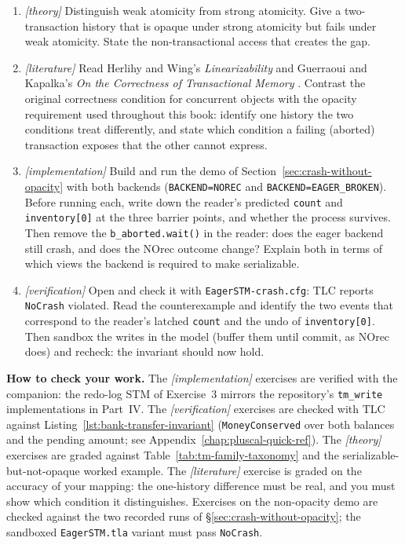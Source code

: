 \begin{enumerate}
\item \emph{[theory]} Distinguish weak atomicity from strong atomicity.
Give a two-transaction history that is opaque under strong atomicity
but fails under weak atomicity. State the non-transactional access
that creates the gap.

\item \emph{[literature]} Read Herlihy and Wing's \emph{Linearizability}
\cite{herlihywing90} and Guerraoui and Kapalka's \emph{On the Correctness
of Transactional Memory} \cite{guerraoui08correctness}.  Contrast the
original correctness condition for concurrent objects with the
opacity requirement used throughout this book: identify one history
the two conditions treat differently, and state which condition a
failing (aborted) transaction exposes that the other cannot express.

\item \emph{[implementation]} Build and run the demo of
Section~\ref{sec:crash-without-opacity} with both backends
(\texttt{BACKEND=NOREC} and \texttt{BACKEND=EAGER\_BROKEN}). Before running
each, write down the reader's predicted \texttt{count} and
\texttt{inventory[0]} at the three barrier points, and whether the process
survives. Then remove the \texttt{b\_aborted.wait()} in the reader: does the
eager backend still crash, and does the NOrec outcome change? Explain both in
terms of which views the backend is required to make serializable.

\item \emph{[verification]} Open  and check it
with \texttt{EagerSTM-crash.cfg}: TLC reports \texttt{NoCrash} violated.
Read the counterexample and identify the two events that correspond to the
reader's latched \texttt{count} and the undo of \texttt{inventory[0]}. Then
sandbox the writes in the model (buffer them until commit, as NOrec does) and
recheck: the invariant should now hold.
\end{enumerate}

\textbf{How to check your work.} The \emph{[implementation]} exercises are
verified with the companion: the redo-log STM of Exercise~3 mirrors the
repository's \texttt{tm\_write} implementations in Part~IV.  The
\emph{[verification]} exercises are checked with TLC against
Listing~\ref{lst:bank-transfer-invariant} (\texttt{MoneyConserved} over both
balances and the pending amount; see Appendix~\ref{chap:pluscal-quick-ref}).
The \emph{[theory]} exercises are graded against Table~\ref{tab:tm-family-taxonomy}
and the serializable-but-not-opaque worked example.  The
\emph{[literature]} exercise is graded on the accuracy of your mapping:
the one-history difference must be real, and you must show which
condition it distinguishes.  Exercises on the non-opacity demo are checked
against the two recorded runs of \S\ref{sec:crash-without-opacity}; the
sandboxed \texttt{EagerSTM.tla} variant must pass \texttt{NoCrash}.

